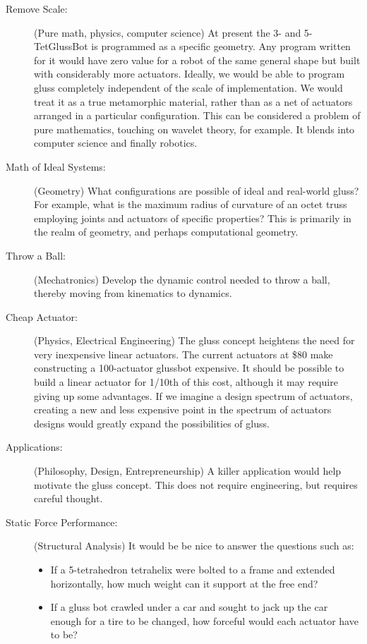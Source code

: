 \documentclass[11pt]{article}
\begin{document}
\begin{description}
\item [Remove Scale:] (Pure math, physics, computer science) At present the 3- and 5-TetGlussBot is programmed
  as a specific geometry. Any program
  written for it would have zero value for a robot of the same general shape but built with considerably
  more actuators. Ideally, we would be able to program gluss completely independent of the scale
  of implementation. We would treat it as a true metamorphic material, rather than as a net of
  actuators arranged in a particular configuration. This can be considered a problem of pure
  mathematics, touching on wavelet theory, for example. It blends into computer science and
  finally robotics.
\item [Math of Ideal Systems:] (Geometry) What configurations are possible of ideal and real-world gluss?
  For example, what is the maximum radius of curvature of an octet truss employing joints
  and actuators of specific properties? This is primarily in the realm of geometry, and perhaps
  computational geometry.
\item [Throw a Ball:] (Mechatronics) Develop the dynamic control needed to throw a ball, thereby moving from
  kinematics to dynamics.
\item [Cheap Actuator:] (Physics, Electrical Engineering) The gluss concept heightens the need for very inexpensive linear
  actuators. The current actuators at \$80 make constructing a 100-actuator glussbot expensive.
  It should be possible to build a linear actuator for 1/10th of this cost, although it may require
  giving up some advantages. If we imagine a design spectrum of actuators, creating a new and
  less expensive point in the spectrum of actuators designs would greatly
  expand the possibilities of gluss.
\item [Applications:] (Philosophy, Design, Entrepreneurship) A killer application would help motivate the gluss concept. This does not
  require engineering, but requires careful thought.
\item [Static Force Performance:] (Structural Analysis)
It would be be nice to answer the questions such as:
\begin{itemize}  
\item If a 5-tetrahedron tetrahelix were bolted to a frame and extended horizontally, how much
  weight can it support at the free end?
\item If a gluss bot crawled under a car and sought to jack up the car enough for a tire
  to be changed, how forceful would each actuator have to be?

\end{itemize}
\end{description}
\end{document}

